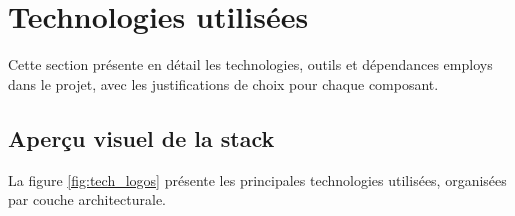 \documentclass[12pt,a4paper,oneside]{report}
\begin{document}
\section{Technologies utilis\'{e}es}

Cette section pr\'{e}sente en d\'{e}tail les technologies, outils et d\'{e}pendances employs dans le projet, avec les justifications de choix pour chaque composant.

\subsection{Aper\c{c}u visuel de la stack}

La figure \ref{fig:tech_logos} pr\'{e}sente les principales technologies utilis\'{e}es, organis\'{e}es par couche architecturale.
\end{document}
